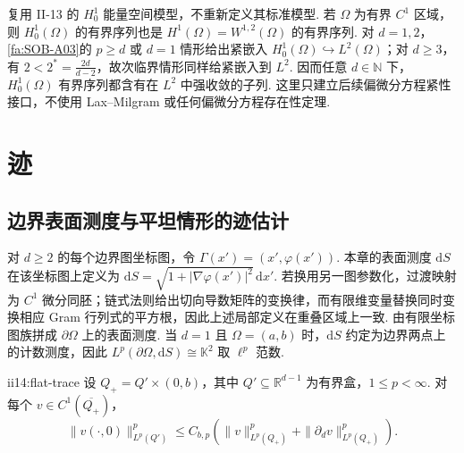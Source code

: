\begin{FAApplication}
复用 II-13 的 \(\displaystyle H_0^1\) 能量空间模型，不重新定义其标准模型. 若 \(\displaystyle\Omega\) 为有界 \(\displaystyle C^1\) 区域，则 \(\displaystyle H_0^1(\Omega)\) 的有界序列也是 \(\displaystyle H^1(\Omega)=W^{1,2}(\Omega)\) 的有界序列. 对 \(\displaystyle d=1,2\)，\autoref{fa:SOB-A03}的 \(\displaystyle p\geqslant d\) 或 \(\displaystyle d=1\) 情形给出紧嵌入 \(\displaystyle H_0^1(\Omega)\hookrightarrow L^2(\Omega)\)；对 \(\displaystyle d\geqslant3\)，有 \(\displaystyle2<2^*=\frac{2d}{d-2}\)，故次临界情形同样给紧嵌入到 \(\displaystyle L^2\). 因而任意 \(\displaystyle d\in\mathbb N\) 下，\(\displaystyle H_0^1(\Omega)\) 有界序列都含有在 \(\displaystyle L^2\) 中强收敛的子列. 这里只建立后续偏微分方程紧性接口，不使用 Lax--Milgram 或任何偏微分方程存在性定理.
\end{FAApplication}

\section{迹}\label{sec:ii14-trace}

\subsection{边界表面测度与平坦情形的迹估计}

对 \(\displaystyle d\geqslant2\) 的每个边界图坐标图，令 \(\displaystyle\Gamma(x')=(x',\varphi(x'))\). 本章的表面测度 \(\displaystyle\mathrm{d}S\) 在该坐标图上定义为 \(\displaystyle \mathrm{d}S = \sqrt{1+|\nabla\varphi(x')|^2}\,\mathrm{d}x'.\)
若换用另一图参数化，过渡映射为 \(\displaystyle C^1\) 微分同胚；链式法则给出切向导数矩阵的变换律，而有限维变量替换同时变换相应 Gram 行列式的平方根，因此上述局部定义在重叠区域上一致. 由有限坐标图族拼成 \(\displaystyle\partial\Omega\) 上的表面测度. 当 \(\displaystyle d=1\) 且 \(\displaystyle\Omega=(a,b)\) 时，\(\displaystyle\mathrm{d}S\) 约定为边界两点上的计数测度，因此 \(\displaystyle L^p(\partial\Omega,\mathrm{d}S)\cong\mathbb K^2\) 取 \(\displaystyle\ell^p\) 范数.

\begin{FALemma}[B][平坦半盒迹估计]{ii14:flat-trace}
设 \(\displaystyle Q_+=Q'\times(0,b)\)，其中 \(\displaystyle Q'\subseteq\mathbb R^{d-1}\) 为有界盒，\(\displaystyle1\leqslant p<\infty\). 对每个 \(\displaystyle v\in C^1(\overline{Q_+})\)，
\[
\|v(\cdot,0)\|_{L^p(Q')}^p
\leqslant
C_{b,p}
\left(
\|v\|_{L^p(Q_+)}^p+
\|\partial_dv\|_{L^p(Q_+)}^p
\right).
\]
\end{FALemma}

